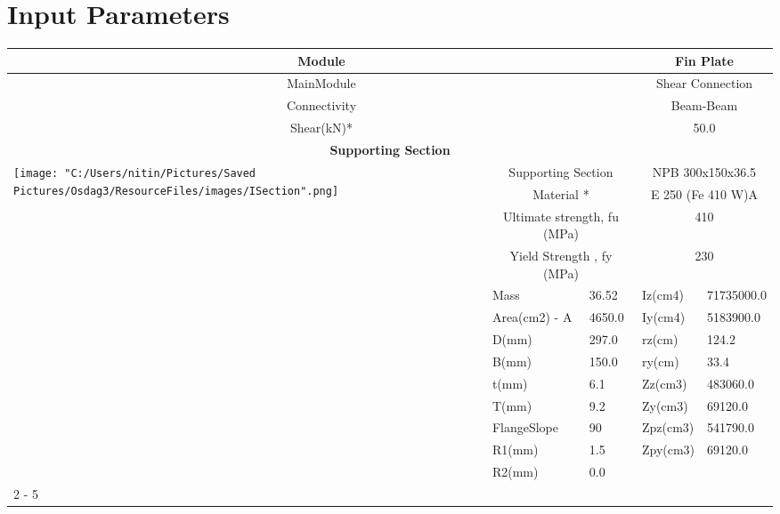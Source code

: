 \documentclass{article}%
\begin{document}
%
\normalsize%
\pagestyle{header}%
\section{Input Parameters}%
\label{sec:InputParameters}%
\renewcommand{\arraystretch}{1.2}%
\begin{longtable}{|p{5cm}|p{2cm}|p{2cm}|p{2cm}|p{5cm}|}%
\hline%
\hline%
\multicolumn{3}{|c|}{Module}&\multicolumn{2}{|c|}{Fin Plate}\\%
\hline%
\hline%
\multicolumn{3}{|c|}{MainModule}&\multicolumn{2}{|c|}{Shear Connection}\\%
\hline%
\hline%
\multicolumn{3}{|c|}{Connectivity}&\multicolumn{2}{|c|}{Beam{-}Beam}\\%
\hline%
\hline%
\multicolumn{3}{|c|}{Shear(kN)*}&\multicolumn{2}{|c|}{50.0}\\%
\hline%
\hline%
\multicolumn{5}{|c|}{\textbf{Supporting Section}}\\%
\hline%
\hline%
\multirow{13}{*}{\texttt{[image: "C:/Users/nitin/Pictures/Saved Pictures/Osdag3/ResourceFiles/images/ISection".png]}}&\multicolumn{2}{|c|}{Supporting Section}&\multicolumn{2}{|c|}{NPB 300x150x36.5}\\%
\cline{2%
-%
5}%
&\multicolumn{2}{|c|}{Material *}&\multicolumn{2}{|c|}{E 250 (Fe 410 W)A}\\%
\cline{2%
-%
5}%
&\multicolumn{2}{|c|}{Ultimate strength, fu (MPa)}&\multicolumn{2}{|c|}{410}\\%
\cline{2%
-%
5}%
&\multicolumn{2}{|c|}{Yield Strength , fy (MPa)}&\multicolumn{2}{|c|}{230}\\%
\cline{2%
-%
5}%
&Mass&36.52&Iz(cm4)&71735000.0\\%
\cline{2%
-%
5}%
&Area(cm2) {-} A&4650.0&Iy(cm4)&5183900.0\\%
\cline{2%
-%
5}%
&D(mm)&297.0&rz(cm)&124.2\\%
\cline{2%
-%
5}%
&B(mm)&150.0&ry(cm)&33.4\\%
\cline{2%
-%
5}%
&t(mm)&6.1&Zz(cm3)&483060.0\\%
\cline{2%
-%
5}%
&T(mm)&9.2&Zy(cm3)&69120.0\\%
\cline{2%
-%
5}%
&FlangeSlope&90&Zpz(cm3)&541790.0\\%
\cline{2%
-%
5}%
&R1(mm)&1.5&Zpy(cm3)&69120.0\\%
\cline{2%
-%
5}%
&R2(mm)&0.0&&\\%
\cline{2%
-%
5}%
\hline%
\multicolumn{5}{|c|}{\textbf{Supported Section}}\\%
\hline%
\hline%

\end{longtable}
\end{document}
